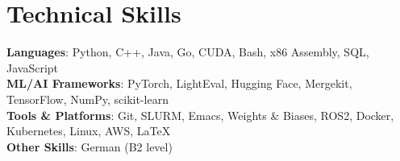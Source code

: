 \documentclass[letterpaper,11pt]{article}
\begin{document}
\section{Technical Skills}
 \begin{itemize}[leftmargin=0.15in, label={}]
    \small{\item{
     \textbf{Languages}{: Python, C++, Java, Go, CUDA, Bash, x86 Assembly, SQL, JavaScript} \\
     \textbf{ML/AI Frameworks}{: PyTorch, LightEval, Hugging Face, Mergekit, TensorFlow, NumPy, scikit-learn} \\
     \textbf{Tools \& Platforms}{: Git, SLURM, Emacs, Weights \& Biases, ROS2, Docker, Kubernetes, Linux, AWS, LaTeX} \\
     \textbf{Other Skills}{: German (B2 level)}
    }}
 \end{itemize}


\end{document}
